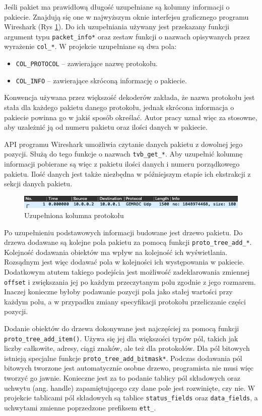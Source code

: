 \documentclass[a4paper, 12pt, twoside, openright]{article}
\begin{document}
	Jeśli pakiet ma prawidłową długość uzupełniane są kolumny informacji o pakiecie. Znajdują się one w najwyższym oknie interfejsu
	graficznego programu Wireshark (Rys \ref{fig:col}). Do ich uzupełniania używany jest przekazany funkcji argument
	typu \texttt{packet\_info*} oraz zestaw funkcji o nazwach opisywanych przez wyrażenie \texttt{col\_*}. W projekcie uzupełniane są dwa pola:
	\begin{itemize}
		\item \texttt{COL\_PROTOCOL} -- zawierające nazwę protokołu.
		\item \texttt{COL\_INFO} -- zawierające skróconą informację o pakiecie.
	\end{itemize}
	Konwencja używana przez większość dekoderów zakłada, że nazwa protokołu jest stała dla każdego pakietu danego protokołu, jednak skrócona
	informacja o pakiecie powinna go w jakiś sposób określać. Autor pracy uznał więc za stosowne, aby uzależnić ją
	od numeru pakietu oraz ilości danych w pakiecie.

	API programu Wireshark umożliwia czytanie danych pakietu z dowolnej jego pozycji. Służą do tego funkcje o nazwach \texttt{tvb\_get\_*}.
	Aby uzupełnić kolumnę informacji pobierane są więc z pakietu ilości danych i numeru porządkowego pakietu. Ilość danych jest także niezbędna
	w późniejszym etapie ich ekstrakcji z sekcji danych pakietu.

	\begin{figure}[h]
		\centering
			\includegraphics[width=1.0\textwidth]{img/screenshot_col.png}
		\caption{Uzupełniona kolumna protokołu}
		\label{fig:col}
	\end{figure}

	Po uzupełnieniu podstawowych informacji budowane jest drzewo pakietu. Do drzewa dodawane są kolejne pola pakietu za pomocą
	funkcji \texttt{proto\_tree\_add\_*}. Kolejność dodawania obiektów ma wpływ na kolejność ich wyświetlania. Rozsądnym jest więc
	dodawać pola w kolejności ich występowania w pakiecie. Dodatkowym atutem takiego podejścia jest możliwość zadeklarowania zmiennej \texttt{offset}
	i zwiększania jej po każdym przeczytanym polu zgodnie z jego rozmarem. Inaczej konieczne byłoby podawanie pozycji pola jako
	stałej wartości przy każdym polu, a w przypadku zmiany specyfikacji protokołu przeliczanie części pozycji.

	Dodanie obiektów do drzewa dokonywane jest najczęściej za pomocą funkcji \texttt{proto\_tree\_add\_item()}.
	Używa się jej dla większości typów pól, takich jak liczby całkowite, adresy, ciągi znaków, ale też dla protokołów.
	Dla pól bitowych istnieją specjalne funkcje \texttt{proto\_tree\_add\_bitmask*}. Podczas dodawania pól bitowych tworzone jest automatycznie
	osobne drzewo, programista nie musi więc tworzyć go jawnie. Konieczne jest za to podanie tablicy pól składowych
	oraz uchwytu (ang. handle) zapamiętującego czy dane pole jest rozwinięte, czy nie. W projekcie tablicami
	pól składowych są tablice \texttt{status\_fields} oraz \texttt{data\_fields}, a uchwytami zmienne poprzedzone prefiksem \texttt{ett\_}.
\end{document}
